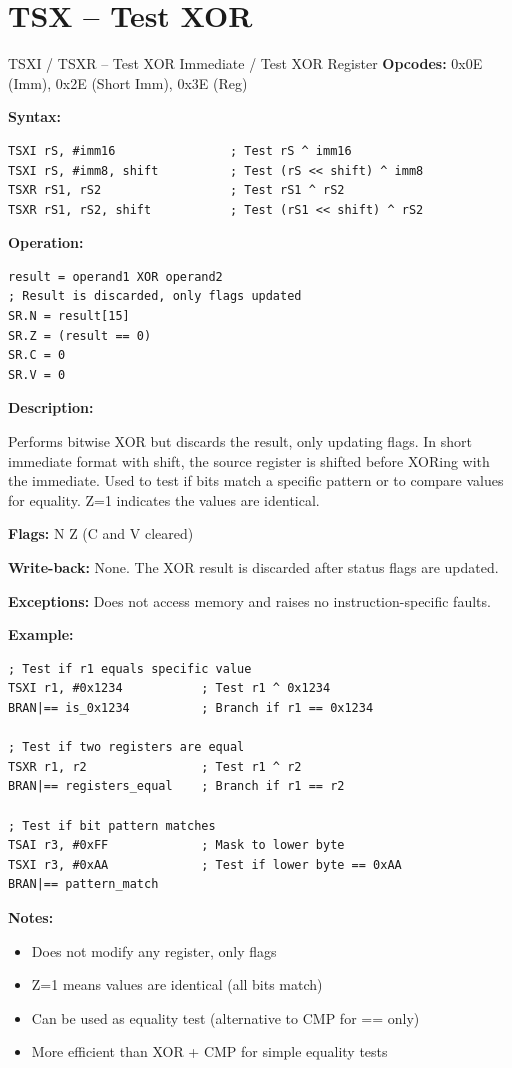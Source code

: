 \section{TSX -- Test XOR}

\begin{instructionbox}{TSXI / TSXR -- Test XOR Immediate / Test XOR Register}
	\textbf{Opcodes:} 0x0E (Imm), 0x2E (Short Imm), 0x3E (Reg)

	\textbf{Syntax:}
	\begin{lstlisting}
TSXI rS, #imm16                ; Test rS ^ imm16
TSXI rS, #imm8, shift          ; Test (rS << shift) ^ imm8
TSXR rS1, rS2                  ; Test rS1 ^ rS2
TSXR rS1, rS2, shift           ; Test (rS1 << shift) ^ rS2
\end{lstlisting}

	\textbf{Operation:}
	\begin{verbatim}
result = operand1 XOR operand2
; Result is discarded, only flags updated
SR.N = result[15]
SR.Z = (result == 0)
SR.C = 0
SR.V = 0
\end{verbatim}

	\textbf{Description:}

	Performs bitwise XOR but discards the result, only updating flags. In short immediate format with shift, the source
	register is shifted before XORing with the immediate. Used to test if bits match a specific pattern or to compare
	values for equality. Z=1 indicates the values are identical.

	\textbf{Flags:} N Z (C and V cleared)

	\textbf{Write-back:} None. The XOR result is discarded after status flags are updated.

	\textbf{Exceptions:} Does not access memory and raises no instruction-specific faults.

	\textbf{Example:}
	\begin{lstlisting}
; Test if r1 equals specific value
TSXI r1, #0x1234           ; Test r1 ^ 0x1234
BRAN|== is_0x1234          ; Branch if r1 == 0x1234

; Test if two registers are equal
TSXR r1, r2                ; Test r1 ^ r2
BRAN|== registers_equal    ; Branch if r1 == r2

; Test if bit pattern matches
TSAI r3, #0xFF             ; Mask to lower byte
TSXI r3, #0xAA             ; Test if lower byte == 0xAA
BRAN|== pattern_match
\end{lstlisting}

	\textbf{Notes:}
	\begin{itemize}
		\item Does not modify any register, only flags
		\item Z=1 means values are identical (all bits match)
		\item Can be used as equality test (alternative to CMP for == only)
		\item More efficient than XOR + CMP for simple equality tests
	\end{itemize}
\end{instructionbox}

